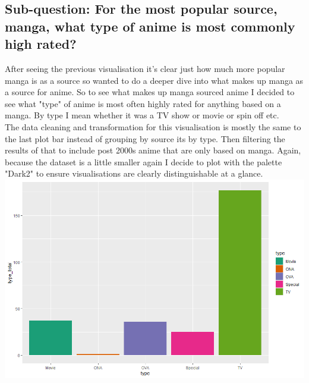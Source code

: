 \documentclass[a4paper]{article}
\begin{document}
	\subsection*{Sub-question: For the most popular source, manga, what type of anime is most commonly high rated?}
	After seeing the previous visualisation it's clear just how much more popular manga is as a source so wanted to do a deeper dive into what makes up manga as a source for anime. So to see what makes up manga sourced anime I decided to see what "type" of anime is most often highly rated for anything based on a manga. By type I mean whether it was a TV show or movie or spin off etc.\\
	The data cleaning and transformation for this visualisation is mostly the same to the last plot bar instead of grouping by source its by type. Then filtering the results of that to include post 2000s anime that are only based on manga. Again, because the dataset is a little smaller again I decide to plot with the palette "Dark2" to ensure visualisations are clearly distinguishable at a glance.\\
	\noindent\includegraphics[scale=0.60]{TopAnimeTypeByManga.png}
	
	\pagebreak
	  
\end{document}
